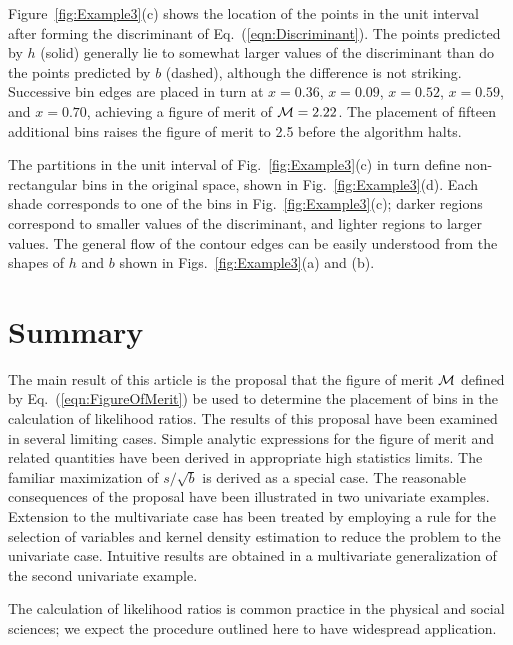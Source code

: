 \documentclass[twocolumn,twoside,prd]{revtex4} %
\begin{document}
Figure~\ref{fig:Example3}(c) shows the location of the points in the unit interval after forming the discriminant of Eq.~(\ref{eqn:Discriminant}).  The points predicted by $h$ (solid) generally lie to somewhat larger values of the discriminant than do the points predicted by $b$ (dashed), although the difference is not striking.  Successive bin edges are placed in turn at $x=0.36$, $x=0.09$, $x=0.52$, $x=0.59$, and $x=0.70$, achieving a figure of merit of ${\cal M}=2.22$.  The placement of fifteen additional bins raises the figure of merit to 2.5 before the algorithm halts.  

The partitions in the unit interval of Fig.~\ref{fig:Example3}(c) in turn define non-rectangular bins in the original space, shown in Fig.~\ref{fig:Example3}(d).  Each shade corresponds to one of the bins in Fig.~\ref{fig:Example3}(c); darker regions correspond to smaller values of the discriminant, and lighter regions to larger values.  The general flow of the contour edges can be easily understood from the shapes of $h$ and $b$ shown in Figs.~\ref{fig:Example3}(a) and (b).

\section{Summary}

The main result of this article is the proposal that the figure of merit ${\cal M}$ defined by Eq.~(\ref{eqn:FigureOfMerit}) be used to determine the placement of bins in the calculation of likelihood ratios.  The results of this proposal have been examined in several limiting cases.  Simple analytic expressions for the figure of merit and related quantities have been derived in appropriate high statistics limits.  The familiar maximization of $s/\sqrt{b}$ is derived as a special case.  The reasonable consequences of the proposal have been illustrated in two univariate examples.  Extension to the multivariate case has been treated by employing a rule for the selection of variables and kernel density estimation to reduce the problem to the univariate case.  Intuitive results are obtained in a multivariate generalization of the second univariate example.

The calculation of likelihood ratios is common practice in the physical and social sciences; we expect the procedure outlined here to have widespread application.




\end{document}

